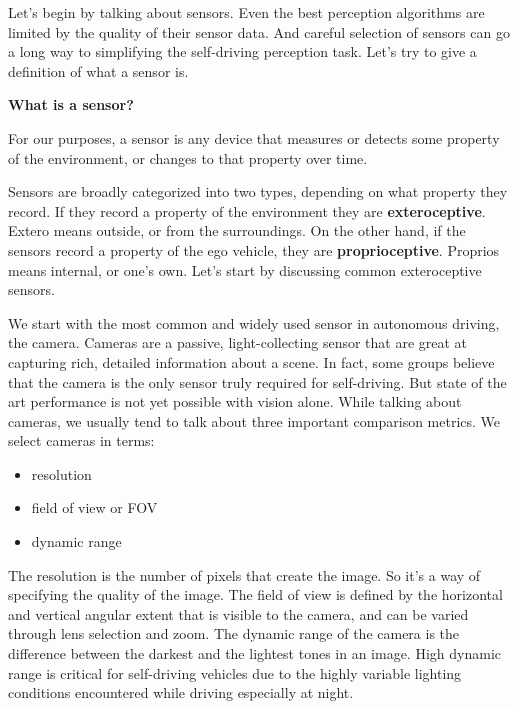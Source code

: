 Let's begin by talking about sensors. Even the best perception algorithms
are limited by the quality of their sensor data. And careful selection of sensors
can go a long way to simplifying the self-driving perception task. Let's try to give a definition of
what a sensor is.


\begin{framed}
\theoremstyle{definition}
\begin{definition}{\textbf{What is a sensor? }}

For our purposes, a sensor is any device that measures or
detects some property of the environment, or changes to that property over time.
\end{definition}
\end{framed}


Sensors are broadly categorized into two types, depending on what property they record. If they record a property of
the environment they are {\textbf{exteroceptive}}. Extero means outside, or from the surroundings. On the other hand, if the sensors
record a property of the ego vehicle, they are {\textbf{proprioceptive}}. Proprios means internal, or one's own. Let's start by discussing
common exteroceptive sensors. 



We start with the most common and widely used sensor in autonomous driving, the camera. Cameras are a passive, light-collecting
sensor that are great at capturing rich, detailed information about a scene. In fact, some groups believe that the
camera is the only sensor truly required for self-driving. But state of the art performance is
not yet possible with vision alone. While talking about cameras, we usually tend to talk about three
important comparison metrics. We select cameras in terms:


\begin{itemize}
\item resolution
\item field of view or FOV
\item dynamic range
\end{itemize}

The resolution is the number of pixels that create the image. So it's a way of specifying
the quality of the image.  The field of view is defined by the horizontal and vertical angular extent that is visible to the camera, and can be
varied through lens selection and zoom. The dynamic range of the camera is the difference between the darkest and the lightest tones in an image. High dynamic range is critical for
self-driving vehicles due to the highly variable lighting conditions encountered
while driving especially at night. 

